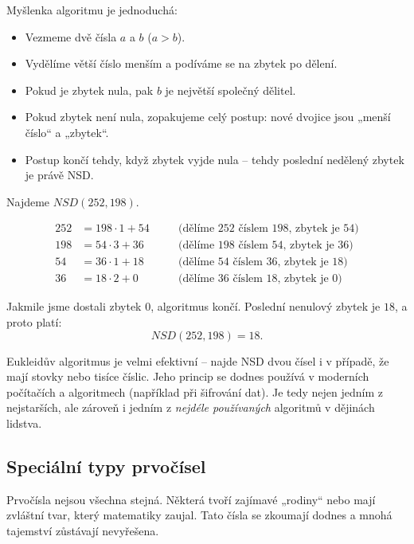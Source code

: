 \documentclass[12pt,a4paper]{article}
\begin{document}
Myšlenka algoritmu je jednoduchá:  
\begin{itemize}
    \item Vezmeme dvě čísla $a$ a $b$ ($a > b$).  
    \item Vydělíme větší číslo menším a podíváme se na zbytek po dělení.  
    \item Pokud je zbytek nula, pak $b$ je největší společný dělitel.  
    \item Pokud zbytek není nula, zopakujeme celý postup: nové dvojice jsou „menší číslo“ a „zbytek“.  
    \item Postup končí tehdy, když zbytek vyjde nula – tehdy poslední nedělený zbytek je právě NSD.  
\end{itemize}

\begin{examplebox}
Najdeme $NSD(252, 198)$.  

\begin{align*}
252 &= 198 \cdot 1 + 54 &\quad &\text{(dělíme 252 číslem 198, zbytek je 54)} \\[4pt]
198 &= 54 \cdot 3 + 36 &\quad &\text{(dělíme 198 číslem 54, zbytek je 36)} \\[4pt]
54  &= 36 \cdot 1 + 18 &\quad &\text{(dělíme 54 číslem 36, zbytek je 18)} \\[4pt]
36  &= 18 \cdot 2 + 0 &\quad &\text{(dělíme 36 číslem 18, zbytek je 0)} 
\end{align*}

Jakmile jsme dostali zbytek 0, algoritmus končí. Poslední nenulový zbytek je $18$, a proto platí:  
\[
NSD(252,198) = 18.
\]
\end{examplebox}

\begin{notebox}
Eukleidův algoritmus je velmi efektivní – najde NSD dvou čísel i v případě, že mají stovky nebo tisíce číslic.  
Jeho princip se dodnes používá v moderních počítačích a algoritmech (například při šifrování dat).  
Je tedy nejen jedním z nejstarších, ale zároveň i jedním z \emph{nejdéle používaných} algoritmů v dějinách lidstva.
\end{notebox}


\subsection{Speciální typy prvočísel}

Prvočísla nejsou všechna stejná. Některá tvoří zajímavé „rodiny“ nebo mají zvláštní tvar, který matematiky zaujal.  
Tato čísla se zkoumají dodnes a mnohá tajemství zůstávají nevyřešena.
\end{document}
